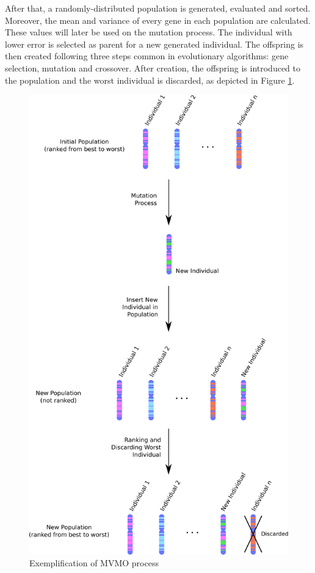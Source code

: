 After that, a randomly-distributed population is generated, evaluated and sorted. Moreover, the mean and variance of every gene in each population are calculated. These values will later be used on the mutation process. The individual with lower error is selected as parent for a new generated individual. The offspring is then created following three steps common in evolutionary algorithms: gene selection, mutation and crossover. After creation, the offspring is introduced to the population and the worst individual is discarded, as depicted in Figure \ref{fig: MVMOprocess}.

\begin{figure}[h]
	\caption{Exemplification of MVMO process}
	\begin{center}
		\includegraphics[scale=.2]{Images/MVMO_process2.eps}
	\end{center}
	\label{fig: MVMOprocess}
\end{figure}

